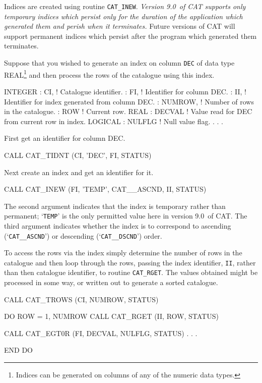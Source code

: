 \documentclass[11pt,twoside]{starlink}
\providecommand{\CATversion}{9.0~}
\begin{document}
Indices are created using routine \texttt{CAT\_INEW}. \textit{Version
\CATversion of CAT supports only temporary indices which persist only
for the duration of the application which generated them and perish
when it terminates.} Future versions of CAT will support permanent
indices which persist after the program which generated them terminates.

Suppose that you wished to generate an index on column \texttt{DEC} of data
type REAL\footnote{Indices can be generated on columns of any of the
numeric data types.} and then process the rows of the catalogue
using this index.

\begin{terminalv}
      INTEGER
     :  CI,      ! Catalogue identifier.
     :  FI,      ! Identifier for column DEC.
     :  II,      ! Identifier for index generated from column DEC.
     :  NUMROW,  ! Number of rows in the catalogue.
     :  ROW      ! Current row.
      REAL
     :  DECVAL   ! Value read for DEC from current row in index.
      LOGICAL
     :  NULFLG   ! Null value flag.
       .
       .
       .
\end{terminalv}

First get an identifier for column DEC.

\begin{terminalv}
      CALL CAT_TIDNT (CI, 'DEC', FI, STATUS)
\end{terminalv}

Next create an index and get an identifier for it.

\begin{terminalv}
      CALL CAT_INEW (FI, 'TEMP', CAT__ASCND, II, STATUS)
\end{terminalv}

The second argument indicates that the index is temporary rather than
permanent; `\texttt{TEMP}' is the only permitted value here in version
\CATversion of CAT. The third argument indicates whether the index is to
correspond to ascending (`\texttt{CAT\_\_ASCND}') or descending (`\texttt{CAT\_\_DSCND}') order.

To access the rows via the index simply determine the number of rows in
the catalogue and then loop through the rows, passing the index identifier,
\texttt{II}, rather than then catalogue identifier, to routine \texttt{CAT\_RGET}. The values obtained might be processed in some way, or
written out to generate a sorted catalogue.

\begin{terminalv}
      CALL CAT_TROWS (CI, NUMROW, STATUS)

      DO ROW = 1, NUMROW
         CALL CAT_RGET (II, ROW, STATUS)

         CALL CAT_EGT0R (FI, DECVAL, NULFLG, STATUS)
           .
           .
           .

      END DO
\end{terminalv}
\end{document}
